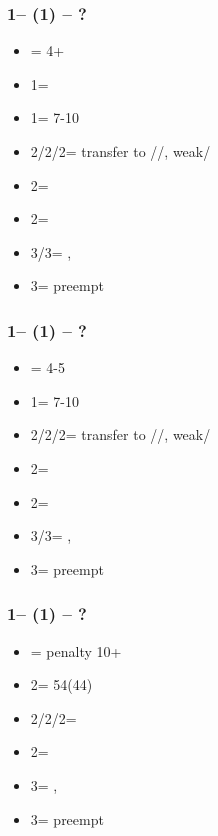 \subsubsection*{1\diams -- (1\hearts) -- ?}
\begin{itemize}
    \item \dbl = 4+\spades
    \item 1\spades = \nt
    \item 1\nt = 7-10
    \item 2\clubs/2\hearts/2\spades = transfer to \diams/\spades/\clubs, weak/\gf
    \item 2\diams = \diams\ \inv
    \item 2\nt = \inv
    \item 3\clubs/3\spades = \nat, \inv
    \item 3\diams = preempt
\end{itemize}

\subsubsection*{1\diams -- (1\spades) -- ?}
\begin{itemize}
    \item \dbl = 4-5\hearts
    \item 1\nt = 7-10
    \item 2\clubs/2\diams/2\spades = transfer to \diams/\hearts/\clubs, weak/\gf
    \item 2\hearts = \diams\ \inv
    \item 2\nt = \inv
    \item 3\clubs/3\hearts = \nat, \inv
    \item 3\diams = preempt
\end{itemize}

\subsubsection*{1\diams -- (1\nt) -- ?}
\begin{itemize}
    \item \dbl = penalty 10+
    \item 2\clubs = 54\major (44)
    \item 2\diams/2\hearts/2\spades = \nf
    \item 2\nt = \inv\ \diams
    \item 3\anysuit = \nat, \inv\ \unbal
    \item 3\diams = preempt
\end{itemize}

